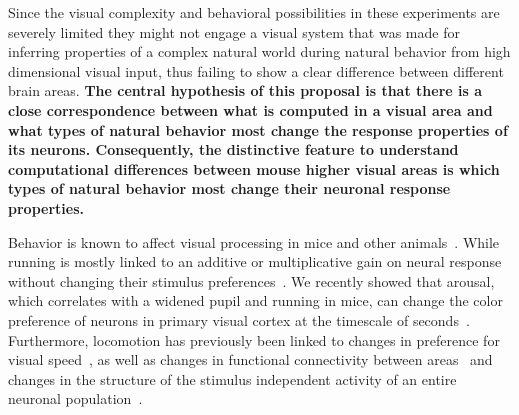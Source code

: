 \documentclass[COG,11pt]{ercgrant}
\begin{document}
Since the visual complexity and behavioral possibilities in these experiments are severely limited they might not engage a visual system that was made for inferring properties of a complex natural world during natural behavior from high dimensional visual input, thus failing to show a clear difference between different brain areas.
\textbf{The central hypothesis of this proposal is that there is a close correspondence between what is computed in a visual area and what types of natural behavior most change the response properties of its neurons. Consequently, the distinctive feature to understand computational differences between mouse higher visual areas is which types of natural behavior most change their neuronal response properties.}

Behavior is known to affect visual processing in mice and other animals~\parencite{Niell2010-bs, Musall2019-kd, Erisken2014-un,Christensen2017-bx}. 
While running is mostly linked to an additive or multiplicative gain on neural response without changing their stimulus preferences~\parencite{Dadarlat2017-jw, Mineault2016-fk}.
We recently showed that arousal, which correlates with a widened pupil and running in mice, can change the color preference of neurons in primary visual cortex at the timescale of seconds~\parencite{Franke2022-do}. 
Furthermore, locomotion has previously been linked to changes in preference for visual speed~\parencite{Andermann2011-vw}, as well as changes in functional connectivity between areas~\parencite{Clancy2019-ta} and changes in the structure of the stimulus independent activity of an entire neuronal population~\parencite{Horrocks2021-re,Stringer2019-lt}. 
\end{document}

